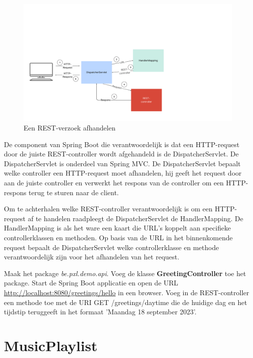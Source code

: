 \begin{figure}[H]
  \includegraphics[width=\linewidth]{images/chapter-rest/dispatcherservlet.png}
  \caption{Een REST-verzoek afhandelen}
  \label{fig:test_passed}
\end{figure}

De component van Spring Boot die verantwoordelijk is dat een HTTP-request door de juiste REST-controller wordt afgehandeld is de DispatcherServlet.  De DispatcherServlet is onderdeel van Spring MVC.  De DispatcherServlet bepaalt welke controller een HTTP-request moet afhandelen,  hij geeft het request door aan de juiste controller en  verwerkt het respons van de controller om een HTTP-respons terug te sturen naar de client.

Om te achterhalen welke REST-controller verantwoordelijk is om een HTTP-request af te handelen raadpleegt de DispatcherServlet de HandlerMapping. De HandlerMapping is als het ware een kaart die URL's koppelt aan specifieke controllerklassen en methoden.
Op basis van de URL in het binnenkomende request bepaalt de DispatcherServlet welke controllerklasse en methode verantwoordelijk zijn voor het afhandelen van het request.


\begin{oefening}
Maak het package \textit{be.pxl.demo.api}.  Voeg de klasse \textbf{GreetingController} toe het package.  Start de Spring Boot applicatie en open de URL \url{http://localhost:8080/greetings/hello} in een browser. Voeg in de REST-controller een methode toe met de URI GET /greetings/daytime die de huidige dag en het tijdstip teruggeeft in het formaat 'Maandag 18 september 2023'.
\end{oefening}

\section{MusicPlaylist}

